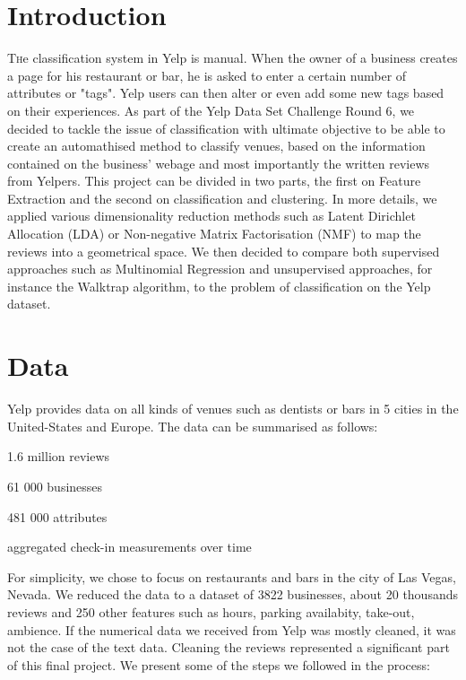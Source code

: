\documentclass[twoside]{article}
\begin{document}
\begin{multicols}{2} %

\section{Introduction}

\lettrine[nindent=0em,lines=1]{T}he classification system in Yelp is manual. When the owner of a business creates a page for his restaurant or bar, he is asked to enter a certain number of attributes or "tags". Yelp users can then alter or even add some new tags based on their experiences. As part of the Yelp Data Set Challenge Round 6, we decided to tackle the issue of classification with ultimate objective to be able to create an automathised method to classify venues, based on the information contained on the business' webage and most importantly the written reviews from Yelpers. This project can be divided in two parts, the first on Feature Extraction and the second on classification and clustering. In more details, we applied various dimensionality reduction methods such as Latent Dirichlet Allocation (LDA) or Non-negative Matrix Factorisation (NMF) to map the reviews into a geometrical space. We then decided to compare both supervised approaches such as Multinomial Regression and unsupervised approaches, for instance the Walktrap algorithm, to the problem of classification on the Yelp dataset.

\section{Data}

Yelp provides data on all kinds of venues such as dentists or bars in 5 cities in the United-States and Europe. The data can be summarised as follows:

\begin{compactitem}
	\item 1.6 million reviews
	\item 61 000 businesses		
	\item 481 000 attributes 
	\item aggregated check-in measurements over time
\end{compactitem}

\noindent For simplicity, we chose to focus on restaurants and bars in the city of Las Vegas, Nevada. We reduced the data to a dataset of 3822 businesses, about 20 thousands reviews and 250 other features such as hours, parking availabity, take-out, ambience. If the numerical data we received from Yelp was mostly cleaned, it was not the case of the text data. Cleaning the reviews represented a significant part of this final project. We present some of the steps we followed in the process:\\


\end{multicols}
\end{document}
